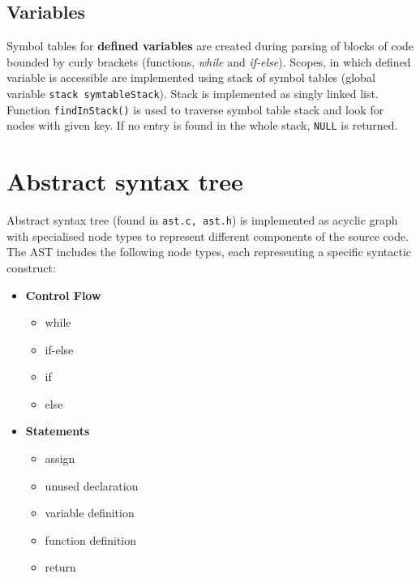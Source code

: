 \documentclass[a4paper, 11pt]{article}
\begin{document}
\subsection{Variables}
Symbol tables for \textbf{defined variables} are created during parsing of blocks of code bounded by curly brackets (functions, \textit{while} and \textit{if-else}).
Scopes, in which defined variable is accessible are implemented using stack of symbol tables (global variable \verb|stack symtableStack|).
Stack is implemented as singly linked list. Function \verb|findInStack()| is used to traverse symbol table stack and look for nodes with given key.
If no entry is found in the whole stack, \verb|NULL| is returned.


\section{Abstract syntax tree}\label{sec:AST}
Abstract syntax tree (found in \verb|ast.c, ast.h|) is implemented as acyclic graph with specialised node types to represent
different components of the source code.
The AST includes the following node types, each representing a specific syntactic construct: 
\newline
\noindent
\begin{minipage}[t]{0.3\textwidth}
\begin{itemize}
    \item \textbf{Control Flow}
    \begin{itemize}
        \itemsep-0.1em
        \item while
        \item if-else
        \item if
        \item else
    \end{itemize}
\end{itemize}
\end{minipage}%
\begin{minipage}[t]{0.3\textwidth}
\begin{itemize}
    \item \textbf{Statements}
    \begin{itemize}
        \itemsep-0.1em
        \item assign
        \item unused declaration
        \item variable definition
        \item function definition
        \item return
    \end{itemize}
\end{itemize}
\end{minipage}
\end{document}
